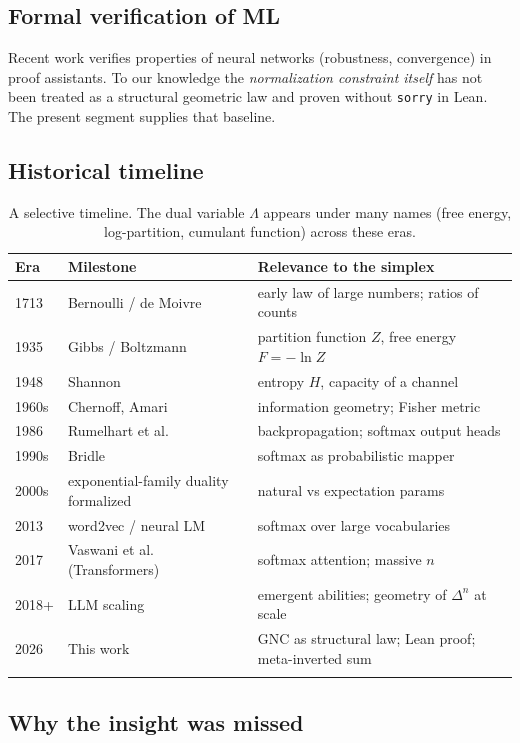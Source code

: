 \documentclass[11pt]{article}
\newcommand{\simplex}[1]{\Delta^{#1}}
\begin{document}
\subsection{Formal verification of ML}
\label{sec:rel-fv}

Recent work verifies properties of neural networks (robustness, convergence)
in proof assistants. To our knowledge the \emph{normalization constraint itself}
has not been treated as a structural geometric law and proven without
\texttt{sorry} in Lean. The present segment supplies that baseline.

\subsection{Historical timeline}
\label{sec:rel-timeline}

\begin{longtable}{@{}llp{8.5cm}@{}}
\toprule
Era & Milestone & Relevance to the simplex \\
\midrule
1713 & Bernoulli / de Moivre & early law of large numbers; ratios of counts \\
1935 & Gibbs / Boltzmann & partition function $Z$, free energy $F=-\ln Z$ \\
1948 & Shannon & entropy $H$, capacity of a channel \\
1960s & Chernoff, Amari & information geometry; Fisher metric \\
1986 & Rumelhart et al. & backpropagation; softmax output heads \\
1990s & Bridle & softmax as probabilistic mapper \\
2000s & exponential-family duality formalized & natural vs expectation params \\
2013 & word2vec / neural LM & softmax over large vocabularies \\
2017 & Vaswani et al. (Transformers) & softmax attention; massive $n$ \\
2018+ & LLM scaling & emergent abilities; geometry of $\simplex{n}$ at scale \\
2026 & This work & GNC as structural law; Lean proof; meta-inverted sum \\
\bottomrule
\caption{A selective timeline. The dual variable $\Lambda$ appears under many
names (free energy, log-partition, cumulant function) across these eras.}
\label{tab:timeline}
\end{longtable}

\subsection{Why the insight was missed}
\label{sec:rel-missed}
\end{document}
